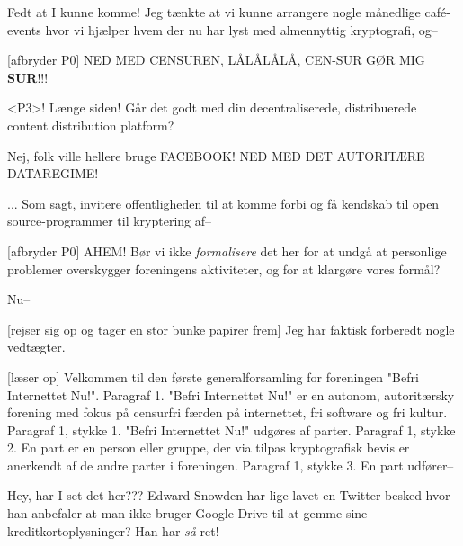\documentclass[a4paper,11pt]{article}
\begin{document}
\begin{sketch}


 Fedt at I kunne komme!  Jeg tænkte at vi kunne arrangere nogle
månedlige café-events hvor vi hjælper hvem der nu har lyst med almennyttig
kryptografi, og--


[afbryder P0] NED MED CENSUREN, LÅLÅLÅLÅ, CEN-SUR GØR MIG
\textbf{SUR}!!!

 <P3>!  Længe siden!  Går det godt med din decentraliserede,
distribuerede content distribution platform?

 Nej, folk ville hellere bruge FACEBOOK!  NED MED DET AUTORITÆRE
DATAREGIME!


 ... Som sagt, invitere offentligheden til at komme forbi og få
kendskab til open source-programmer til kryptering af--

[afbryder P0] AHEM!  Bør vi ikke \emph{formalisere} det her for at
undgå at personlige problemer overskygger foreningens aktiviteter, og for at
klargøre vores formål?

 Nu--

[rejser sig op og tager en stor bunke papirer frem] Jeg har faktisk
forberedt nogle vedtægter.


[læser op] Velkommen til den første generalforsamling for foreningen
"Befri Internettet Nu!".  Paragraf 1.  "Befri Internettet Nu!" er en autonom,
autoritærsky forening med fokus på censurfri færden på internettet, fri software
og fri kultur.  Paragraf 1, stykke 1.  "Befri Internettet Nu!" udgøres af
parter. 
Paragraf 1, stykke 2.  En part er en person eller gruppe, der via
tilpas kryptografisk bevis er anerkendt af de andre parter i foreningen.
Paragraf 1, stykke 3.  En part udfører--


 Hey, har I set det her???  Edward Snowden har lige lavet en
Twitter-besked hvor han anbefaler at man ikke bruger Google Drive til at gemme
sine kreditkortoplysninger?  Han har \emph{så} ret!


\end{sketch}
\end{document}
